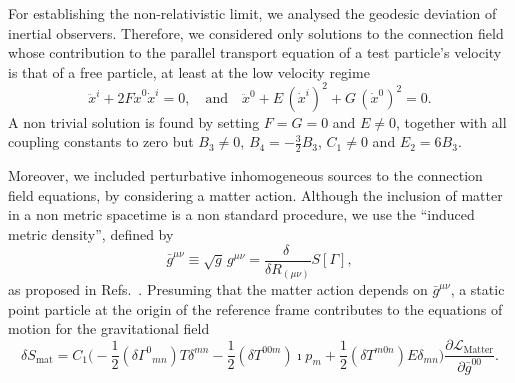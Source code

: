\documentclass[aps,prl,twocolumn,superscriptaddress,showpacs,showkeys]{revtex4-1}
\begin{document}

For establishing the non-relativistic limit, we analysed the geodesic deviation of inertial observers. Therefore, we considered only solutions to the connection field whose contribution to the parallel transport equation of a test particle's velocity is that of a free particle, at least at the low velocity regime
\begin{equation} 
  \ddot{x}^i+2F\dot{x}^0\dot{x}^i=0, \quad \text{and} \quad \ddot{x}^0 + E \, (\dot{x}^i)^2 + G \, (\dot{x}^0)^2 = 0.
\end{equation}
A non trivial solution is found by setting $F = G = 0$ and $E \neq 0$, together with all coupling constants to zero but $B_3 \neq 0$, $B_4 = -\tfrac{3}{2} B_3$, $C_1\neq 0$ and $E_2= 6 B_3$.

Moreover, we included perturbative inhomogeneous sources to the connection field equations, by considering a matter action. Although the inclusion of matter in a non metric spacetime is a non standard procedure, we use the ``induced metric density'', defined by 
\begin{equation}
  \label{metric}
  \bar{g}^{\mu\nu} \equiv \sqrt{g} \, g^{\mu\nu} = \frac{\delta\ }{\delta R_{(\mu\nu)}} S[\Gamma],
\end{equation}
as proposed in Refs.~\cite{Eddington1923math,*schrodinger1950space,Poplawski:2012bw}. Presuming that the matter action depends on $\bar{g}^{\mu\nu}$, a static point particle at the origin of the reference frame contributes to the equations of motion for the gravitational field
\begin{dmath}
  \label{mattervariation}
  \delta {S}_{\text{mat}} =  C_1 \Big(- \frac{1}{2} ({\delta\Gamma}^{0}{}_{m n})  T {\delta}^{m n} - \frac{1}{2}  ({\delta T}^{0 0 m})  \imath {p}_{m} + \frac{1}{2}  ({\delta T}^{m 0 n})  E {\delta}_{m n} \Big)\frac{\partial\mathcal{L}_{\text{Matter}}}{\partial \bar{g}^{00}}.
\end{dmath}
\end{document}
